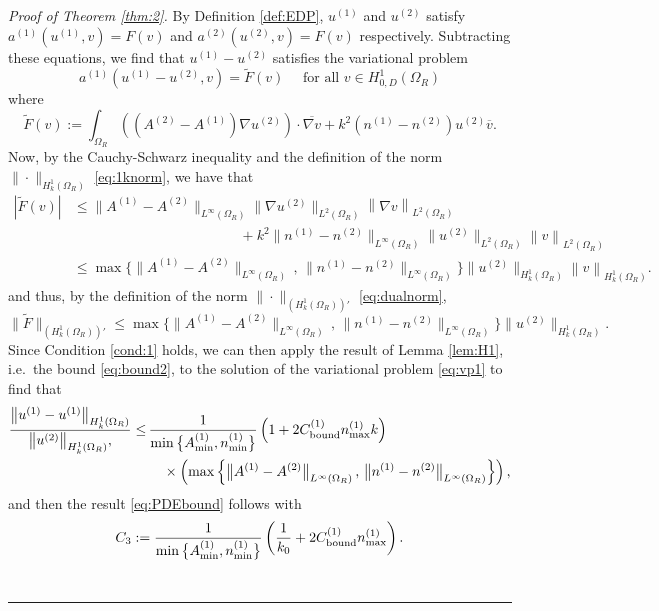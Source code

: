 \documentclass[10pt]{article}%
\newenvironment{proof}[1][Proof]{\noindent \emph{#1.} }
{\hfill \ \rule{0.5em}{0.5em}}
\numberwithin{equation}{section}
\newcommand{\beq}{\begin{equation}}
\newcommand{\eeq}{\end{equation}}
\newcommand{\beqs}{\begin{equation*}}
\newcommand{\eeqs}{\end{equation*}}
\newcommand{\bpf}{\begin{proof}}
\newcommand{\epf}{\end{proof}}
\newcommand{\HoDkk}{{H^1_{k}(\domain_R)}}
\newcommand*{\N}[1]{\left\|#1\right\|}
\newcommand{\tfa}{\text{ for all }}
\newcommand{\domain}{\Omega}
\newcommand{\coeffAo}{A^{(1)}}
\newcommand{\coeffAt}{A^{(2)}}
\newcommand{\coeffno}{n^{(1)}}
\newcommand{\coeffnt}{n^{(2)}}
\begin{document}
\bpf[Proof of Theorem \ref{thm:2}]
By Definition \ref{def:EDP}, $u^{(1)}$ and $u^{(2)}$ satisfy $a^{(1)}(u^{(1)}, v) = F(v)$ and 
$a^{(2)}(u^{(2)}, v) = F(v)$ respectively. Subtracting these equations, we find that $u^{(1)}- u^{(2)}$ satisfies the variational problem
\beq\label{eq:vp1}
a^{(1)}(u^{(1)}-u^{(2)},v) = \widetilde{F}(v) \quad\tfa v\in H^1_{0,D}(\Omega_R)
\eeq
where
\beqs
 \widetilde{F}(v):= \int_{\Omega_R} \left((\coeffAt-\coeffAo) \nabla u^{(2)}\right) \cdot\overline{\nabla v} + k^2 (\coeffno-\coeffnt) u^{(2)}\overline{v}.
\eeqs
Now, by the Cauchy-Schwarz inequality and the definition of the norm $\|\cdot\|_{\HoDkk}$ \eqref{eq:1knorm}, we have that
\begin{align*}
| \widetilde{F}(v)| &\leq \big\|\coeffAo-\coeffAt\big\|_{L^\infty(\Omega_R)} \big\|\nabla u^{(2)}\big\|_{L^2(\Omega_R)}
\N{\nabla v}_{L^2(\Omega_R)} 
\\& \hspace{5cm}+ k^2 
\big\|\coeffno-\coeffnt\big\|_{L^\infty(\Omega_R)} \big\| u^{(2)}\big\|_{L^2(\Omega_R)}
\N{v}_{L^2(\Omega_R)}\\
&\leq\max\Big\{\big\|\coeffAo-\coeffAt\big\|_{L^\infty(\Omega_R)}\,,\, \big\|\coeffno-\coeffnt\big\|_{L^\infty(\Omega_R)}\Big\}
\big\| u^{(2)}\big\|_{\HoDkk} \N{v}_{\HoDkk}.
\end{align*}
and thus, by the definition of the norm $\|\cdot\|_{(\HoDkk)'}$ \eqref{eq:dualnorm},
\beqs
\big\|\widetilde{F}\big\|_{(\HoDkk)'}\leq \max\Big\{\big\|\coeffAo-\coeffAt\big\|_{L^\infty(\Omega_R)}\,,\, \big\|\coeffno-\coeffnt\big\|_{L^\infty(\Omega_R)}\Big\}
\big\| u^{(2)}\big\|_{\HoDkk}.
\eeqs
Since Condition \ref{cond:1} holds, we can then apply the result of Lemma \ref{lem:H1}, i.e.~the bound \eqref{eq:bound2}, to the solution of the variational problem \eqref{eq:vp1}  to find that 
\begin{align*}
\frac{\big\| u^{(1)} - u^{(1)}\big\|_{\HoDkk}}
{\big\| u^{(2)}\big\|_{\HoDkk}, 
}
 \leq 
\,&\frac{1}{\min\big\{\coeffAo_{\min},\coeffno_{\min}\big\}}\left( 1 + 2 C^{(1)}_{\rm bound}\coeffno_{\max}  k\right)
\\
&\quad\times \left(\max\Big\{\big\|\coeffAo-\coeffAt\big\|_{L^\infty(\Omega_R)}\,,\, \big\|\coeffno-\coeffnt\big\|_{L^\infty(\Omega_R)}\Big\}\right),
\end{align*}
and then the result \eqref{eq:PDEbound} follows with 
\beq\label{eq:C3}
C_3:= \frac{1}{\min\big\{\coeffAo_{\min},\coeffno_{\min}\big\}}\left( \frac{1}{k_0} + 2 C^{(1)}_{\rm bound}\coeffno_{\max}  \right).
\eeq
\epf
\end{document}
